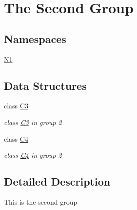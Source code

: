 \hypertarget{group__group2}{}\section{The Second Group}
\label{group__group2}
\subsection*{Namespaces}
\begin{DoxyCompactItemize}
\item 
 \hyperlink{namespace_n1}{N1}
\end{DoxyCompactItemize}
\subsection*{Data Structures}
\begin{DoxyCompactItemize}
\item 
class \hyperlink{class_c3}{C3}
\begin{DoxyCompactList}\small\item\em class \hyperlink{class_c3}{C3} in group 2 \end{DoxyCompactList}\item 
class \hyperlink{class_c4}{C4}
\begin{DoxyCompactList}\small\item\em class \hyperlink{class_c4}{C4} in group 2 \end{DoxyCompactList}\end{DoxyCompactItemize}


\subsection{Detailed Description}
This is the second group 